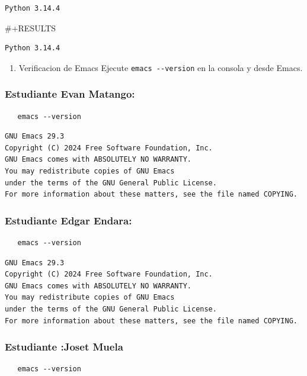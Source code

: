 \documentclass{article}
\begin{document}
\begin{enumerate}
\begin{verbatim}
Python 3.14.4
\end{verbatim}


\#+RESULTS
\begin{verbatim}
Python 3.14.4
\end{verbatim}



\begin{enumerate}
\item Verificacion de Emacs
Ejecute \texttt{emacs -{}-{}version} en la consola y desde Emacs.
\end{enumerate}


\subsubsection{Estudiante Evan Matango:}
\label{sec:org4054a49}
\begin{verbatim}
   emacs --version
\end{verbatim}

\begin{verbatim}
GNU Emacs 29.3
Copyright (C) 2024 Free Software Foundation, Inc.
GNU Emacs comes with ABSOLUTELY NO WARRANTY.
You may redistribute copies of GNU Emacs
under the terms of the GNU General Public License.
For more information about these matters, see the file named COPYING.
\end{verbatim}

\subsubsection{Estudiante Edgar Endara:}
\label{sec:org9d45538}
\begin{verbatim}
   emacs --version
\end{verbatim}

\begin{verbatim}
GNU Emacs 29.3
Copyright (C) 2024 Free Software Foundation, Inc.
GNU Emacs comes with ABSOLUTELY NO WARRANTY.
You may redistribute copies of GNU Emacs
under the terms of the GNU General Public License.
For more information about these matters, see the file named COPYING.
\end{verbatim}

\subsubsection{Estudiante :Joset Muela}
\label{sec:orgcb9490a}
\begin{verbatim}
   emacs --version
\end{verbatim}


\end{enumerate}
\end{document}

